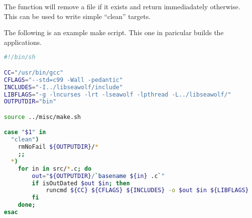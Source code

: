 The function  will remove a file if it exists and return
immediadately otherwise. This can be used to write simple ``clean'' targets. 

The following is an example make script. This one in paricular builds the
applications.

\begin{lstlisting}[language=sh, caption=Applications build script]
#!/bin/sh

CC="/usr/bin/gcc"
CFLAGS="--std=c99 -Wall -pedantic"
INCLUDES="-I../libseawolf/include"
LIBFLAGS="-g -lncurses -lrt -lseawolf -lpthread -L../libseawolf/"
OUTPUTDIR="bin"

source ../misc/make.sh

case "$1" in
  "clean")
    rmNoFail ${OUTPUTDIR}/*
    ;;
  *)
    for in in src/*.c; do
        out="${OUTPUTDIR}/`basename ${in} .c`"
        if isOutDated $out $in; then
            runcmd ${CC} ${CFLAGS} ${INCLUDES} -o $out $in ${LIBFLAGS}
        fi
    done;
esac
\end{lstlisting}
